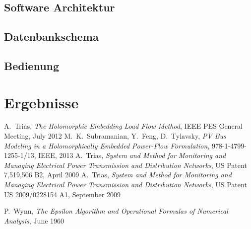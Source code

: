 \documentclass[12pt,a4paper]{article}
\begin{document}
	\subsection{Software Architektur}
	
	\subsection{Datenbankschema}
	
	\subsection{Bedienung}
	
	\section{Ergebnisse}
	
	\begin{thebibliography}{1}
			A.~Trias, \emph{The Holomorphic Embedding Load Flow Method}, IEEE PES General Meeting, July 2012
			M.~K.~Subramanian, Y.~Feng, D.~Tylavsky, \emph{PV Bus Modeling in a Holomorphically Embedded Power-Flow Formulation}, 978-1-4799-1255-1/13, IEEE, 2013
			A.~Trias, \emph{System and Method for Monitoring and Managing Electrical Power Transmission and Distribution Networks}, US Patent 7,519,506 B2, April 2009
			A.~Trias, \emph{System and Method for Monitoring and Managing Electrical Power Transmission and Distribution Networks}, US Patent US 2009/0228154 A1, September 2009
			
			P.~Wynn, \emph{The Epsilon Algorithm and Operational Formulas of Numerical Analysis}, June 1960

	\end{thebibliography}
\end{document}
